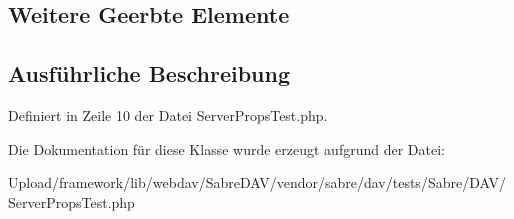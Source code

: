 \subsection*{Weitere Geerbte Elemente}


\subsection{Ausführliche Beschreibung}


Definiert in Zeile 10 der Datei Server\+Props\+Test.\+php.



Die Dokumentation für diese Klasse wurde erzeugt aufgrund der Datei\+:\begin{DoxyCompactItemize}
\item 
Upload/framework/lib/webdav/\+Sabre\+D\+A\+V/vendor/sabre/dav/tests/\+Sabre/\+D\+A\+V/Server\+Props\+Test.\+php\end{DoxyCompactItemize}
